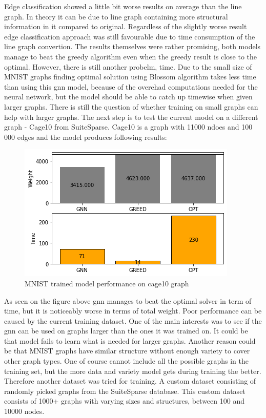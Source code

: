 Edge classification showed a little bit worse results on average than the line graph. In theory it can be due to line graph containing more structural information in it compared to original. Regardless of the slightly worse result edge classification approach was still favourable due to time consumption of the line graph convertion. The results themselves were rather promising, both models manage to beat the greedy algorithm even when the greedy result is close to the optimal. However, there is still another probelm, time. Due to the small size of MNIST graphs finding optimal solution using Blossom algorithm takes less time than using this \gls{gnn} model, because of the overehad computations needed for the neural network, but the model should be able to catch up timewise when given larger graphs. There is still the question of whether training on small graphs can help with larger graphs. The next step is to test the current model on a different graph - Cage10 from SuiteSparse. Cage10 is a graph with 11000 ndoes and 100 000 edges and the model produces following results: 

\begin{figure}[H]
    \centering
    \includegraphics[scale=1.0]{figures/MNISTtrainCAGE10}
    \caption{MNIST trained model performance on cage10 graph}
    \label{model performance}
\end{figure}

As seen on the figure above \gls{gnn} manages to beat the optimal solver in term of time, but it is noticeably worse in terms of total weight. Poor performance can be caused by the current training dataset. One of the main interests was to see if the \gls{gnn} can be used on graphs larger than the ones it was trained on. It could be that model fails to learn what is needed for larger graphs. Another reason could be that MNIST graphs have similar structure without enough variety to cover other graph types. One of course cannot include all the possible graphs in the training set, but the more data and variety model gets during training the better. Therefore another dataset was tried for training. A custom dataset consisting of randomly picked graphs from the SuiteSparse database. This custom dataset consists of 1000+ graphs with varying sizes and structures, between 100 and 10000 nodes.

